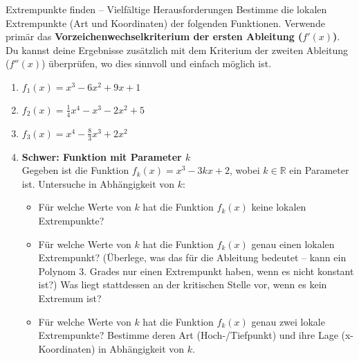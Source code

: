 \begin{aufgabenumgebung}{Extrempunkte finden – Vielfältige Herausforderungen}
Bestimme die lokalen Extrempunkte (Art und Koordinaten) der folgenden Funktionen. Verwende primär das \textbf{Vorzeichenwechselkriterium der ersten Ableitung ($f'(x)$)}. Du kannst deine Ergebnisse zusätzlich mit dem Kriterium der zweiten Ableitung ($f''(x)$) überprüfen, wo dies sinnvoll und einfach möglich ist.
\begin{enumerate}
    \item $f_1(x) = x^3 - 6x^2 + 9x + 1$


    \item $f_2(x) = \frac{1}{4}x^4 - x^3 - 2x^2 + 5$

    \item $f_3(x) = x^4 - \frac{8}{3}x^3 + 2x^2$

    \item \textbf{Schwer: Funktion mit Parameter $k$} \\
        Gegeben ist die Funktion $f_k(x) = x^3 - 3kx + 2$, wobei $k \in \mathbb{R}$ ein Parameter ist. Untersuche in Abhängigkeit von $k$:
        \begin{itemize}
            \item Für welche Werte von $k$ hat die Funktion $f_k(x)$ keine lokalen Extrempunkte?
            \item Für welche Werte von $k$ hat die Funktion $f_k(x)$ genau einen lokalen Extrempunkt? (Überlege, was das für die Ableitung bedeutet – kann ein Polynom 3. Grades nur einen Extrempunkt haben, wenn es nicht konstant ist?) Was liegt stattdessen an der kritischen Stelle vor, wenn es kein Extremum ist?
            \item Für welche Werte von $k$ hat die Funktion $f_k(x)$ genau zwei lokale Extrempunkte? Bestimme deren Art (Hoch-/Tiefpunkt) und ihre Lage (x-Koordinaten) in Abhängigkeit von $k$.
        \end{itemize}


\end{enumerate}
\end{aufgabenumgebung}

